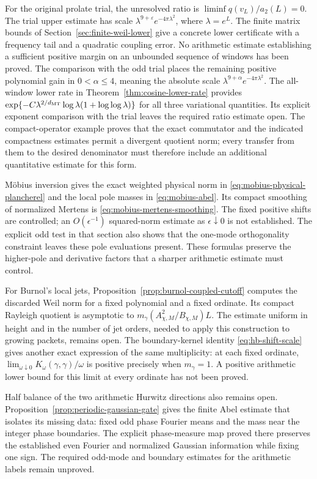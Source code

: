 For the original prolate trial, the unresolved ratio is
$\liminf q(v_L)/a_2(L)=0$. The trial upper estimate has scale
$\lambda^{9+\varepsilon}e^{-4\pi\lambda^2}$, where
$\lambda=e^L$. The finite matrix bounds of
Section~\ref{sec:finite-weil-lower} give a concrete lower certificate
with a frequency tail and a quadratic coupling error. No arithmetic
estimate establishing a sufficient positive margin on an unbounded
sequence of windows has been proved. The comparison with the odd
trial places the remaining positive polynomial gain in
$0<\alpha\le4$, meaning the absolute scale
$\lambda^{9+\alpha}e^{-4\pi\lambda^2}$.
The all-window lower rate in Theorem~\ref{thm:cosine-lower-rate}
provides \(\exp\{-C\lambda^{2/d_{\rm MT}}\log\lambda
(1+\log\log\lambda)\}\) for all three variational quantities.
Its explicit exponent comparison with the trial leaves the required
ratio estimate open.
The compact-operator example proves that the exact commutator and
the indicated compactness estimates permit a divergent quotient
norm; every transfer from them to the desired denominator must
therefore include an additional quantitative estimate for this form.

M\"obius inversion gives the exact weighted physical norm in
\eqref{eq:mobius-physical-plancherel} and the local pole masses in
\eqref{eq:mobius-abel}. Its compact smoothing of normalized Mertens
is \eqref{eq:mobius-mertens-smoothing}. The fixed positive shifts
are controlled; an \(O(\epsilon^{-1})\) squared-norm estimate as
\(\epsilon\downarrow0\) is not established. The explicit odd test
in that section also shows that the one-mode orthogonality constraint
leaves these pole evaluations present. These formulas preserve the
higher-pole and derivative factors that a sharper arithmetic estimate
must control.

For Burnol's local jets, Proposition~\ref{prop:burnol-coupled-cutoff}
computes the discarded Weil norm for a fixed polynomial and a fixed
ordinate. Its compact Rayleigh quotient is asymptotic to
$m_\gamma(A_{\chi,M}^2/B_{\chi,M})L$. The estimate uniform in
height and in the number of jet orders, needed to apply this construction
to growing packets, remains open. The boundary-kernel identity
\eqref{eq:hb-shift-scale} gives another exact expression of the
same multiplicity: at each fixed ordinate,
$\lim_{\omega\downarrow0}K_\omega(\gamma,\gamma)/\omega$
is positive precisely when $m_\gamma=1$. A positive arithmetic
lower bound for this limit at every ordinate has not been proved.

Half balance of the two arithmetic Hurwitz directions also remains
open. Proposition~\ref{prop:periodic-gaussian-gate} gives the finite
Abel estimate that isolates its missing data: fixed odd phase Fourier
means and the mass near the integer phase boundaries. The explicit
phase-measure map proved there preserves the established even Fourier
and normalized Gaussian information while fixing one sign. The required
odd-mode and boundary estimates for the arithmetic labels remain
unproved.

